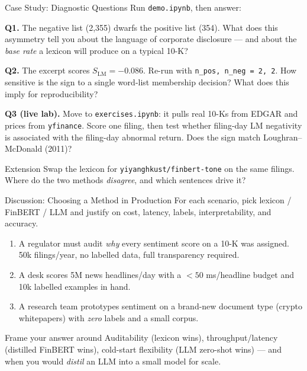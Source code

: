 \documentclass[9pt,t]{beamer}
\begin{document}
\begin{frame}{Case Study: Diagnostic Questions}
Run \texttt{demo.ipynb}, then answer:

\medskip
\textbf{Q1.} The negative list (2{,}355) dwarfs the positive list (354). What does
this asymmetry tell you about the language of corporate disclosure --- and about
the \emph{base rate} a lexicon will produce on a typical 10-K?

\medskip
\textbf{Q2.} The excerpt scores $S_{\text{LM}}=-0.086$. Re-run with
\texttt{n\_pos, n\_neg = 2, 2}. How sensitive is the sign to a single word-list
membership decision? What does this imply for reproducibility?

\medskip
\textbf{Q3 (live lab).} Move to \texttt{exercises.ipynb}: it pulls real 10-Ks from
EDGAR and prices from \texttt{yfinance}. Score one filing, then test whether
filing-day LM negativity is associated with the filing-day abnormal return.
Does the sign match Loughran--McDonald (2011)?

\medskip
\begin{block}{Extension}
Swap the lexicon for \texttt{yiyanghkust/finbert-tone} on the same filings.
Where do the two methods \emph{disagree}, and which sentences drive it?
\end{block}
\end{frame}

\begin{frame}{Discussion: Choosing a Method in Production}
For each scenario, pick lexicon / FinBERT / LLM and justify on cost, latency,
labels, interpretability, and accuracy.

\medskip
\begin{enumerate}
  \item A regulator must audit \emph{why} every sentiment score on a 10-K was
        assigned. 50k filings/year, no labelled data, full transparency required.
  \item A desk scores 5M news headlines/day with a $<50$ ms/headline budget and
        10k labelled examples in hand.
  \item A research team prototypes sentiment on a brand-new document type
        (crypto whitepapers) with \emph{zero} labels and a small corpus.
\end{enumerate}

\medskip
\begin{block}{Frame your answer around}
Auditability (lexicon wins), throughput/latency (distilled FinBERT wins),
cold-start flexibility (LLM zero-shot wins) --- and when you would \emph{distil}
an LLM into a small model for scale.
\end{block}
\end{frame}
\end{document}
